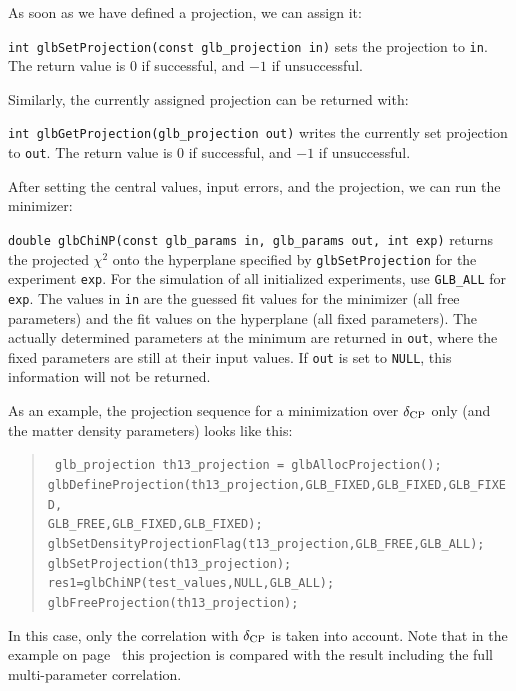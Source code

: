 As soon as we have defined a projection, we can assign it:
\begin{function}
{\tt int glbSetProjection(const glb\_projection in)} sets the projection
to {\tt in}. The return value is $0$ if successful, and $-1$ if
unsuccessful.
\end{function}
Similarly, the currently assigned projection can be returned with:
\begin{function}
{\tt int glbGetProjection(glb\_projection out)} writes the currently
set projection to {\tt out}. The return value is $0$ if successful, and $-1$ if unsuccessful.
\end{function}
After setting the central values, input errors, and the projection, 
we can run the minimizer:
\begin{function}
{\tt double glbChiNP(const glb\_params in, glb\_params out, int exp)} 
returns the projected $\chi^2$ onto the hyperplane specified by 
{\tt glbSetProjection} for the  experiment {\tt exp}. 
For the simulation of all initialized experiments,
use {\tt GLB\_ALL} for {\tt exp}. The values in {\tt in} are the guessed fit values for the minimizer (all free parameters) and the fit values
on the hyperplane (all fixed parameters). The actually determined parameters at the minimum are returned in {\tt out}, where the fixed parameters are still at their input values. If {\tt out} is set to {\tt NULL}, this information will not be returned.
\end{function}
As an example, the projection sequence for a minimization over
$\delta_{\mathrm{CP}}$ only (and the matter density parameters) looks like this:
\begin{quote}
{\tt
  glb\_projection th13\_projection = glbAllocProjection(); \\
  glbDefineProjection(th13\_projection,GLB\_FIXED,GLB\_FIXED,GLB\_FIXED,\\
  \hspace*{2cm} GLB\_FREE,GLB\_FIXED,GLB\_FIXED); \\
  glbSetDensityProjectionFlag(t13\_projection,GLB\_FREE,GLB\_ALL); \\
  glbSetProjection(th13\_projection); \\ 
  res1=glbChiNP(test\_values,NULL,GLB\_ALL); \\
  glbFreeProjection(th13\_projection);
}
\end{quote}
In this case, only the correlation with $\delta_{\mathrm{CP}}$ is taken into account.
Note that in the  example on page~\pageref{ex:corrproj} this projection
is compared with the result including the full multi-parameter correlation.

